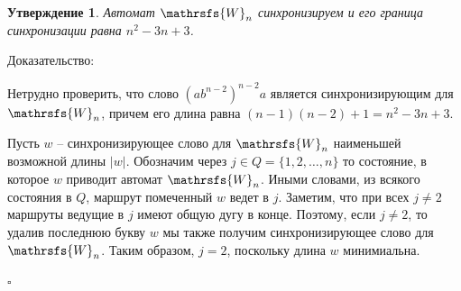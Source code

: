 \documentclass[11pt]{article}
\newcommand{\sw}{reset word}
\newtheorem{theorem}{Утверждение}
\newenvironment{proof}{Доказательство:}{$\square$}
\begin{document}
\begin{theorem}
\label{theorem:anan}
Автомат $\mathrsfs{W}_n$ синхронизируем и его граница синхронизации равна $n^2-3n+3$.
\end{theorem}

\begin{proof}

Нетрудно проверить, что слово $(ab^{n-2})^{n-2}a$ является синхронизирующим
для $\mathrsfs{W}_n$, причем его длина равна $(n-1)(n-2)+1=n^2-3n+3$.



Пусть $w$ -- синхронизирующее слово для $\mathrsfs{W}_n$ наименьшей
возможной длины $|w|$. Обозначим через $j\in Q=\{1,2,\dots,n\}$ то
состояние, в которое $w$ приводит автомат $\mathrsfs{W}_n$. 
Иными словами, из всякого состояния в $Q$, маршрут помеченный $w$ ведет
в $j$. Заметим, что при всех $j\ne 2$ маршруты ведущие в $j$ имеют общую дугу в конце.
Поэтому, если $j\ne 2$, то удалив последнюю букву $w$ мы также получим
синхронизирующее слово для $\mathrsfs{W}_n$.
Таким образом, $j=2$, поскольку длина $w$ минимиальна.




\end{proof}
\end{document}
